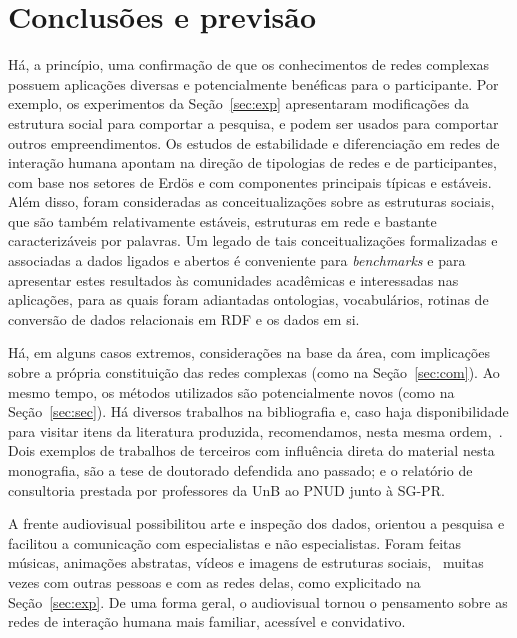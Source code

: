 \documentclass[a4paper,openright,12pt]{report} %
\begin{document}
\chapter{Conclusões e previsão}\label{sec:con}
Há, a princípio, uma confirmação de que os conhecimentos de redes complexas
possuem aplicações diversas e potencialmente benéficas para o participante.
Por exemplo, os experimentos da Seção~\ref{sec:exp} apresentaram modificações da estrutura social para comportar a pesquisa, e podem ser usados para comportar outros empreendimentos. Os estudos de estabilidade e diferenciação em redes de interação humana apontam na direção de tipologias de redes e de participantes, com base nos setores de Erdös e com componentes principais típicas e estáveis.
Além disso, foram consideradas as conceitualizações sobre as estruturas sociais, que são também relativamente estáveis, estruturas em rede e bastante caracterizáveis por palavras.
Um legado de tais conceitualizações formalizadas e associadas a dados ligados e abertos é conveniente para \emph{benchmarks} e para apresentar estes resultados às comunidades acadêmicas e interessadas nas aplicações, para as quais foram adiantadas ontologias, vocabulários, rotinas de conversão de dados relacionais em RDF e os dados em si.

Há, em alguns casos extremos, considerações na base da área,
com implicações sobre a própria constituição das redes complexas
(como na Seção~\ref{sec:com}).
Ao mesmo tempo, os métodos utilizados são potencialmente novos (como na Seção~\ref{sec:sec}).
Há diversos trabalhos na bibliografia e,
caso haja disponibilidade para visitar itens da literatura
produzida, recomendamos, nesta mesma ordem,~\cite{timeS,pnud5,ensaio,gmanePack,4hubs}.
Dois exemplos de trabalhos de terceiros 
com influência direta do material nesta monografia, são a 
tese de doutorado defendida ano passado; e o 
relatório de consultoria prestada por professores da UnB ao PNUD
junto à SG-PR.~\cite{chandra,paulo6}

A frente audiovisual possibilitou arte e inspeção dos dados,
orientou a pesquisa e facilitou a comunicação com
especialistas e não especialistas. Foram feitas músicas,
animações abstratas, vídeos e imagens
de estruturas sociais,~\cite{versinus,4hubs,preludio,timeSS} muitas vezes com outras
pessoas e com as redes delas, como explicitado na Seção~\ref{sec:exp}.
De uma forma geral, o audiovisual
tornou o pensamento sobre as redes de interação
humana mais familiar, acessível e convidativo.
\end{document}
